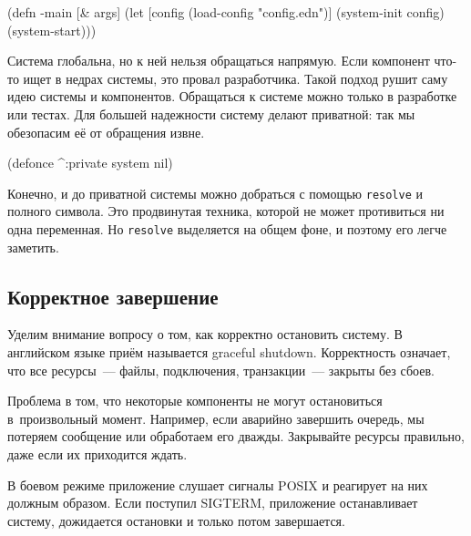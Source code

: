 \else

\begin{english}
  \begin{clojure}
(defn -main [& args]
  (let [config (load-config "config.edn")]
    (system-init config)
    (system-start)))
  \end{clojure}
\end{english}

\fi

Система глобальна, но к ней нельзя обращаться напрямую. Если компонент что-то
ищет в недрах системы, это провал разработчика. Такой подход рушит саму идею
системы и компонентов. Обращаться к системе можно только в разработке или
тестах. Для большей надежности систему делают приватной: так мы обезопасим её от
обращения извне.


\begin{english}
  \begin{clojure}
(defonce ^:private system nil)
  \end{clojure}
\end{english}

Конечно, и до приватной системы можно добраться с помощью \verb|resolve| и
полного символа. Это продвинутая техника, которой не может противиться ни одна
переменная. Но \verb|resolve| выделяется на общем фоне, и поэтому его легче
заметить.

\subsection{Корректное завершение}


Уделим внимание вопросу о том, как корректно остановить систему. В английском
языке приём называется graceful shutdown. Корректность означает, что все
ресурсы~--- файлы, подключения, транзакции~--- закрыты без сбоев.

Проблема в том, что некоторые компоненты не могут остановиться в~произвольный
момент. Например, если аварийно завершить очередь, мы потеряем сообщение или
обработаем его дважды. Закрывайте ресурсы правильно, даже если их приходится
ждать.


В боевом режиме приложение слушает сигналы POSIX и реагирует на них должным
образом. Если поступил SIGTERM, приложение останавливает систему, дожидается
остановки и только потом завершается.

